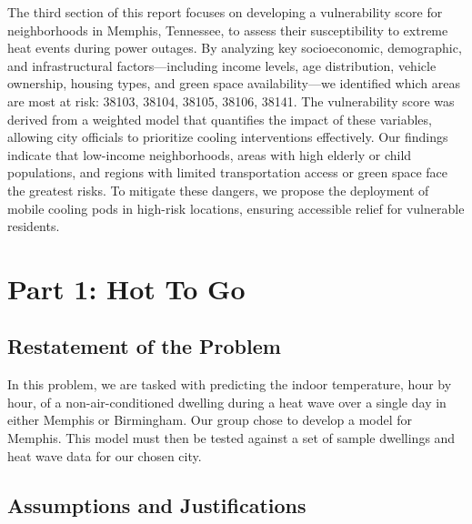 \documentclass[12pt]{article}
\begin{document}
\par The third section of this report focuses on developing a vulnerability score for neighborhoods in Memphis, Tennessee, to assess their susceptibility to extreme heat events during power outages. By analyzing key socioeconomic, demographic, and infrastructural factors—including income levels, age distribution, vehicle ownership, housing types, and green space availability—we identified which areas are most at risk: 38103, 38104, 38105, 38106, 38141. The vulnerability score was derived from a weighted model that quantifies the impact of these variables, allowing city officials to prioritize cooling interventions effectively. Our findings indicate that low-income neighborhoods, areas with high elderly or child populations, and regions with limited transportation access or green space face the greatest risks. To mitigate these dangers, we propose the deployment of mobile cooling pods in high-risk locations, ensuring accessible relief for vulnerable residents.

\newpage
\tableofcontents

{ }
\newpage


\section{Part 1: Hot To Go}

\subsection{Restatement of the Problem}
In this problem, we are tasked with predicting the indoor temperature, hour by hour, of a non-air-conditioned dwelling during a heat wave over a single day in either Memphis or Birmingham. Our group chose to develop a model for Memphis. This model must then be tested against a set of sample dwellings and heat wave data for our chosen city.

\subsection{Assumptions and Justifications}
\end{document}
